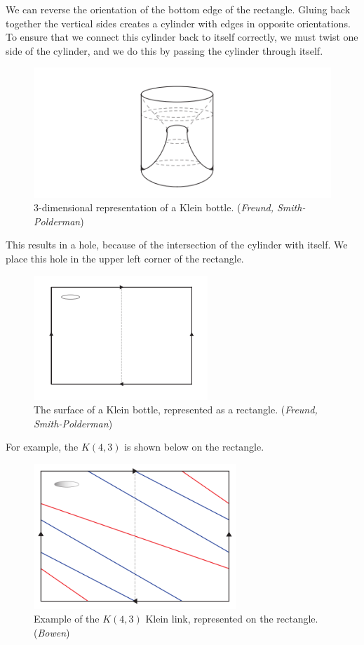 \documentclass[12pt]{article}
\begin{document}
We can reverse the orientation of the bottom edge of the rectangle. Gluing back together the vertical sides creates a cylinder with edges in opposite orientations. To ensure that we connect this cylinder back to itself correctly, we must twist one side of the cylinder, and we do this by passing the cylinder through itself. 

\begin{figure}[H]
\centering
\includegraphics{kleinrep}
\caption{\label{Klein bottle representation} 3-dimensional representation of a Klein bottle. (\textit{Freund, Smith-Polderman})}
\end{figure}

This results in a hole, because of the intersection of the cylinder with itself. We place this hole in the upper left corner of the rectangle. 

\begin{figure}[H]
\centering
\includegraphics{kleinknot}
\caption{\label{Klein rectangle} The surface of a Klein bottle, represented as a rectangle. (\textit{Freund, Smith-Polderman})}
\end{figure}

For example, the $K(4, 3)$ is shown below on the rectangle. 

\begin{figure}[H]
\centering
\includegraphics[width=3in]{k43}
\caption{\label{K(4, 3)} Example of the $K(4, 3)$ Klein link, represented on the rectangle. (\textit{Bowen})}
\end{figure}
\end{document}
